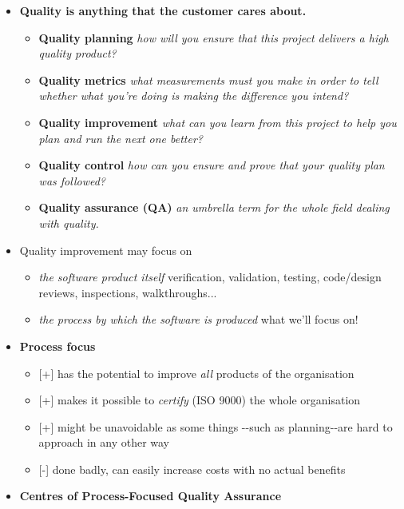 \documentclass[a4paper]{article}
\providecommand{\tightlist}{%
  \setlength{\itemsep}{0pt}\setlength{\parskip}{0pt}}
\begin{document}
\begin{itemize}
\item
  \textbf{Quality is anything that the customer cares about.}

  \begin{itemize}
  \tightlist
  \item
    \textbf{Quality planning} \emph{how will you ensure that this
    project delivers a high quality product?}
  \item
    \textbf{Quality metrics} \emph{what measurements must you make in
    order to tell whether what you're doing is making the difference you
    intend?}
  \item
    \textbf{Quality improvement} \emph{what can you learn from this
    project to help you plan and run the next one better?}
  \item
    \textbf{Quality control} \emph{how can you ensure and prove that
    your quality plan was followed?}
  \item
    \textbf{Quality assurance (QA)} \emph{an umbrella term for the whole
    field dealing with quality.}
  \end{itemize}
\item
  Quality improvement may focus on

  \begin{itemize}
  \tightlist
  \item
    \emph{the software product itself} verification, validation,
    testing, code/design reviews, inspections, walkthroughs...
  \item
    \emph{the process by which the software is produced} what we'll
    focus on!
  \end{itemize}
\item
  \textbf{Process focus}

  \begin{itemize}
  \tightlist
  \item
    {[}+{]} has the potential to improve \emph{all} products of the
    organisation
  \item
    {[}+{]} makes it possible to \emph{certify} (ISO 9000) the whole
    organisation
  \item
    {[}+{]} might be unavoidable as some things -\/-such as
    planning-\/-are hard to approach in any other way
  \item
    {[}-{]} done badly, can easily increase costs with no actual
    benefits
  \end{itemize}
\item
  \textbf{Centres of Process-Focused Quality Assurance}


\end{itemize}
\end{document}
